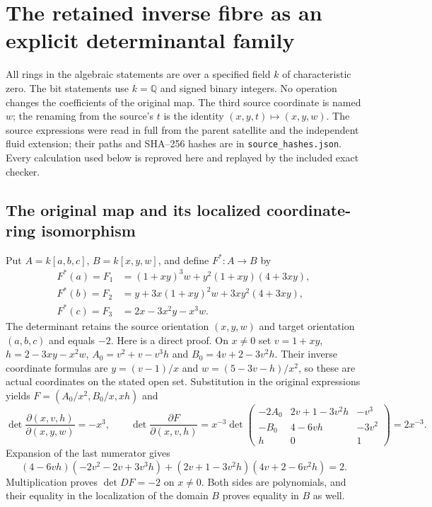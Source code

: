 \section{The retained inverse fibre as an explicit determinantal family}
\label{sec:fc-determinantal}

All rings in the algebraic statements are over a specified field $k$ of
characteristic zero. The bit statements use $k=\mathbb Q$ and signed binary
integers. No operation changes the coefficients of the original map.
The third source coordinate is named $w$; the renaming from the source's
$t$ is the identity $(x,y,t)\mapsto(x,y,w)$. The source expressions were
read in full from the parent satellite and the independent fluid extension;
their paths and SHA--256 hashes are in \texttt{source\_hashes.json}.
Every calculation used below is reproved here and replayed by the included
exact checker.

\subsection{The original map and its localized coordinate-ring isomorphism}

Put $A=k[a,b,c]$, $B=k[x,y,w]$, and define $F^*:A\to B$ by
\begin{align*}
 F^*(a)=F_1&=(1+xy)^3w+y^2(1+xy)(4+3xy),\\
 F^*(b)=F_2&=y+3x(1+xy)^2w+3xy^2(4+3xy),\\
 F^*(c)=F_3&=2x-3x^2y-x^3w.
\end{align*}
The determinant retains the source orientation $(x,y,w)$ and target
orientation $(a,b,c)$ and equals $-2$. Here is a direct proof. On $x\ne0$
set $v=1+xy$, $h=2-3xy-x^2w$, $A_0=v^2+v-v^3h$ and
$B_0=4v+2-3v^2h$. Their inverse coordinate formulas are
$y=(v-1)/x$ and $w=(5-3v-h)/x^2$, so these are actual coordinates
on the stated open set. Substitution in the original expressions yields
$F=(A_0/x^2,B_0/x,xh)$ and
\[
 \det\frac{\partial(x,v,h)}{\partial(x,y,w)}=-x^3,
 \qquad
 \det\frac{\partial F}{\partial(x,v,h)}
 =x^{-3}\det\begin{pmatrix}
 -2A_0&2v+1-3v^2h&-v^3\\
 -B_0&4-6vh&-3v^2\\h&0&1
 \end{pmatrix}=2x^{-3}.
\]
Expansion of the last numerator gives
\[
 (4-6vh)(-2v^2-2v+3v^3h)
 +(2v+1-3v^2h)(4v+2-6v^2h)=2.
\]
Multiplication proves $\det DF=-2$ on $x\ne0$. Both sides are
polynomials, and their equality in the localization of the domain $B$
proves equality in $B$ as well.

